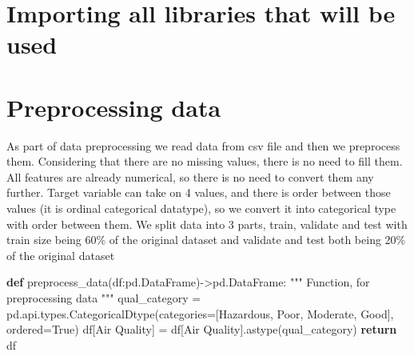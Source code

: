 \documentclass[
  letterpaper,
  DIV=11,
  numbers=noendperiod]{scrartcl}
\newenvironment{Shaded}{\begin{snugshade}}{\end{snugshade}}
\newcommand{\CommentTok}[1]{\textcolor[rgb]{0.37,0.37,0.37}{#1}}
\newcommand{\ControlFlowTok}[1]{\textcolor[rgb]{0.00,0.23,0.31}{\textbf{#1}}}
\newcommand{\KeywordTok}[1]{\textcolor[rgb]{0.00,0.23,0.31}{\textbf{#1}}}
\newcommand{\NormalTok}[1]{\textcolor[rgb]{0.00,0.23,0.31}{#1}}
\newcommand{\OperatorTok}[1]{\textcolor[rgb]{0.37,0.37,0.37}{#1}}
\newcommand{\StringTok}[1]{\textcolor[rgb]{0.13,0.47,0.30}{#1}}
\newcommand{\VariableTok}[1]{\textcolor[rgb]{0.07,0.07,0.07}{#1}}
\begin{document}
\section{Importing all libraries that will be
used}\label{importing-all-libraries-that-will-be-used}

\section{Preprocessing data}\label{preprocessing-data}

As part of data preprocessing we read data from csv file and then we
preprocess them. Considering that there are no missing values, there is
no need to fill them. All features are already numerical, so there is no
need to convert them any further. Target variable can take on 4 values,
and there is order between those values (it is ordinal categorical
datatype), so we convert it into categorical type with order between
them. We split data into 3 parts, train, validate and test with train
size being 60\% of the original dataset and validate and test both being
20\% of the original dataset

\begin{Shaded}
\begin{Highlighting}[]
\KeywordTok{def}\NormalTok{ preprocess\_data(df:pd.DataFrame)}\OperatorTok{{-}\textgreater{}}\NormalTok{pd.DataFrame:}
    \CommentTok{""" Function, for preprocessing data}
\CommentTok{    """}
\NormalTok{    qual\_category }\OperatorTok{=}\NormalTok{ pd.api.types.CategoricalDtype(categories}\OperatorTok{=}\NormalTok{[}\StringTok{\textquotesingle{}Hazardous\textquotesingle{}}\NormalTok{, }\StringTok{\textquotesingle{}Poor\textquotesingle{}}\NormalTok{, }\StringTok{\textquotesingle{}Moderate\textquotesingle{}}\NormalTok{, }\StringTok{\textquotesingle{}Good\textquotesingle{}}\NormalTok{], ordered}\OperatorTok{=}\VariableTok{True}\NormalTok{)}
\NormalTok{    df[}\StringTok{\textquotesingle{}Air Quality\textquotesingle{}}\NormalTok{] }\OperatorTok{=}\NormalTok{ df[}\StringTok{\textquotesingle{}Air Quality\textquotesingle{}}\NormalTok{].astype(qual\_category)}
    \ControlFlowTok{return}\NormalTok{ df}
    
\end{Highlighting}
\end{Shaded}
\end{document}
